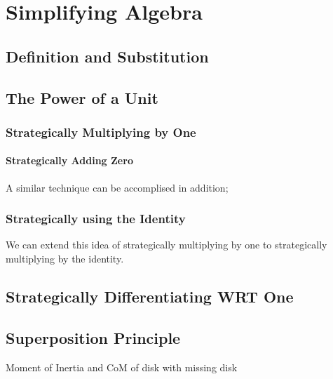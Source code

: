 \chapter{Simplifying Algebra}
\section{Definition and Substitution}

\section{The Power of a Unit}
\subsection{Strategically Multiplying by One}
\subsubsection{Strategically Adding Zero}
A similar technique can be accomplised in addition;
\subsection{Strategically using the Identity}
We can extend this idea of strategically multiplying by one to strategically multiplying by the identity.
\section{Strategically Differentiating WRT One}

\section{Superposition Principle}
Moment of Inertia and CoM of disk with missing disk
